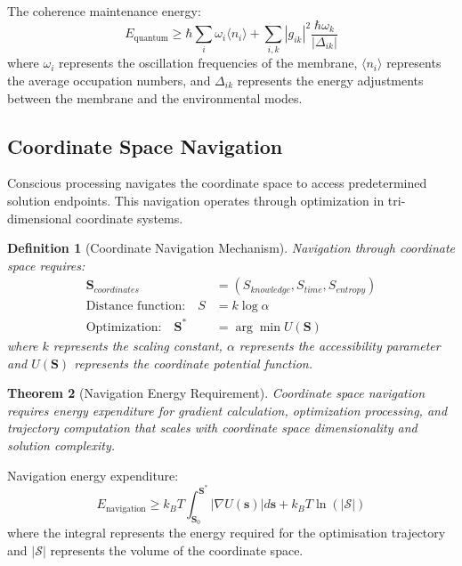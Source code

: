 \documentclass[12pt,a4paper]{article}
\newtheorem{theorem}{Theorem}[section]
\newtheorem{definition}[theorem]{Definition}
\begin{document}
The coherence maintenance energy:
\begin{equation}
E_{\text{quantum}} \geq \hbar \sum_i \omega_i \langle n_i \rangle + \sum_{i,k} |g_{ik}|^2 \frac{\hbar \omega_k}{|\Delta_{ik}|}
\end{equation}
where $\omega_i$ represents the oscillation frequencies of the membrane, $\langle n_i \rangle$ represents the average occupation numbers, and $\Delta_{ik}$ represents the energy adjustments between the membrane and the environmental modes.

\subsection{Coordinate Space Navigation}

Conscious processing navigates the coordinate space to access predetermined solution endpoints. This navigation operates through optimization in tri-dimensional coordinate systems.

\begin{definition}[Coordinate Navigation Mechanism]
Navigation through coordinate space requires:
\begin{align}
\mathbf{S}_{coordinates} &= (S_{knowledge}, S_{time}, S_{entropy}) \\
\text{Distance function:} \quad S &= k \log \alpha \\
\text{Optimization:} \quad \mathbf{S}^* &= \arg\min U(\mathbf{S})
\end{align}
where $k$ represents the scaling constant, $\alpha$ represents the accessibility parameter and $U(\mathbf{S})$ represents the coordinate potential function.
\end{definition}

\begin{theorem}[Navigation Energy Requirement]
Coordinate space navigation requires energy expenditure for gradient calculation, optimization processing, and trajectory computation that scales with coordinate space dimensionality and solution complexity.
\end{theorem}

Navigation energy expenditure:
\begin{equation}
E_{\text{navigation}} \geq k_B T \int_{\mathbf{S}_0}^{\mathbf{S}^*} |\nabla U(\mathbf{s})| d\mathbf{s} + k_B T \ln(|\mathcal{S}|)
\end{equation}
where the integral represents the energy required for the optimisation trajectory and $|\mathcal{S}|$ represents the volume of the coordinate space.
\end{document}
